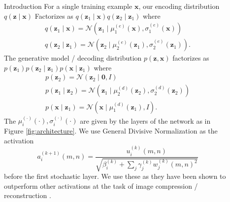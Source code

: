 \documentclass[final]{beamer}
\newlength{\sepwid}
\newlength{\onecolwid}
\newlength{\twocolwid}
\renewcommand{\vec}[1]{\mathbf{#1}}
\newcommand{\N}{\mathcal{N}}
\begin{document}
\begin{frame}[t]
\begin{columns}[t]
\begin{column}{\onecolwid}
\begin{block}{Introduction}
  \noindent
  For a single training example $\vec{x}$, our encoding distribution $q(\vec{z} \mid \vec{x})$
  Factorizes as $q(\vec{z}_1 \mid \vec{x})q(\vec{z}_2 \mid \vec{z}_1)$ where
  \begin{gather*}
    q(\vec{z}_1 \mid \vec{x}) = \N(\vec{z}_1 \mid \mu^{(e)}_1(\vec{x}),
    \sigma^{(e)}_1(\vec{x})) \\
    q(\vec{z}_2 \mid \vec{z}_1) = \N(\vec{z}_2 \mid \mu^{(e)}_2(\vec{z}_1),
    \sigma^{(e)}_2(\vec{z}_1)).
  \end{gather*}
  The generative model / decoding distribution $p(\vec{z},
  \vec{x})$ factorizes as $p(\vec{z}_1)p(\vec{z}_2\mid \vec{z}_1)p(\vec{x} \mid
  \vec{z}_1)$ where
  \begin{gather*}
    p(\vec{z}_2) = \N(\vec{z}_2 \mid \vec{0}, I) \\
    p(\vec{z}_1 \mid \vec{z}_2) = \N(\vec{z}_1 \mid \mu^{(d)}_2(\vec{z}_2),
    \sigma^{(d)}_2(\vec{z}_2)) \\ 
    p(\vec{x} \mid \vec{z}_1) = \N(\vec{x} \mid \mu^{(d)}_1(\vec{z}_1), I). 
  \end{gather*}
  The $\mu^{(\cdot)}_i(\cdot), \sigma^{(\cdot)}_i(\cdot)$ are given by the layers
  of the network as in Figure \ref{fig:architecture}.
  We use General Divisive Normalization \cite{balle2018variational} as the activation
\begin{equation}
  a^{(k + 1)}_i(m, n) = \frac{u^{(k)}_i(m, n)}{\sqrt{\beta^{(k)}_i + \sum_j \gamma^{(k)}_jw^{(k)}_j(m, n)^2}}
\end{equation}
before the first stochastic layer. We use these as they have been shown to
outperform other activations at the task of image compression / reconstruction \cite{balle2018variational}.

\end{block}




\end{column} %

\begin{column}{\sepwid}\end{column} %

\begin{column}{\twocolwid} %




\end{column}
\end{columns}
\end{frame}
\end{document}
